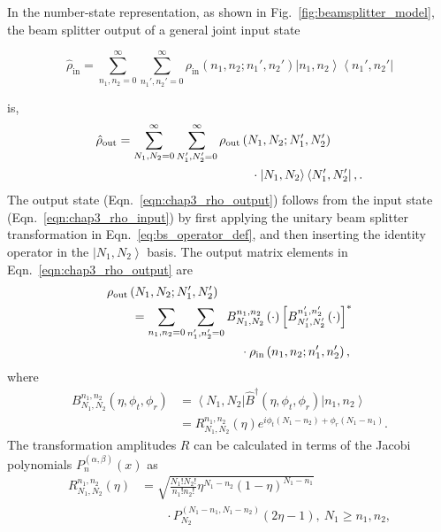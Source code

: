 \documentclass[aps,twocolumn,secnumarabic,amsmath,amssymb,pra,groupedaddress,
showpacs, showkeys]{revtex4-1}
\newcommand{\bra}[1]{\left\langle #1 \right|}
\newcommand{\ket}[1]{\left|#1\right\rangle}
\newcommand{\pna}[1]{\left(#1\right)}
\newcommand{\pnb}[1]{\left[#1\right]}
\newcommand{\eqn}[1]{
\begin{equation}
	#1
\end{equation}
}
\newcommand{\abs}[1]{\left|#1\right|}
\begin{document}
In the number-state representation, as shown in
Fig.~\ref{fig:beamsplitter_model}, the beam splitter output of a general joint
input state
\eqn{
\hat{\rho}_{\textrm{in}}=\sum_{n_1,n_2=0}^{\infty}\sum_{n_1',n_2'=0}^{\infty}
\rho_{\textrm{in}}\pna{n_1,n_2;n_1',n_2'}\ket{n_1,n_2}\bra{n_1',n_2'} \label{eqn:chap3_rho_input}
}
is,
\begin{align}
\hat{\rho}_{\textrm{out}} & =\sum_{N_1,N_2=0}^{\infty}\sum_{N_1',N_2'=0}^{\infty}
\rho_{\textrm{out}}\pna{N_1,N_2;N_1',N_2'} \nonumber \\ & \hspace{1.5in} \cdot\ket{N_1,N_2}\bra{N_1',N_2'},\label{eqn:chap3_rho_output}.
\end{align}
The output state (Eqn.~\ref{eqn:chap3_rho_output}) follows from the input state
(Eqn.~\ref{eqn:chap3_rho_input}) by first applying the unitary beam splitter
transformation in Eqn.~\ref{eq:bs_operator_def}, and then inserting the
identity operator in the $\ket{N_1,N_2}$ basis. The output matrix elements in
Eqn.~\ref{eqn:chap3_rho_output} are
\begin{align}
& \rho_{\textrm{out}}\pna{N_1,N_2;N_1',N_2'} \nonumber \\ & \qquad
=\sum_{n_1,n_2=0}\sum_{n_1',n_2'=0}
B_{N_1,N_2}^{n_1,n_2}\pna{\cdot}\pnb{B_{N_1',N_2'}^{n_1',n_2'}\pna{\cdot}}^{*}
\nonumber \\ & \hspace{1.5in}\cdot\rho_{\textrm{in}}\pna{n_1,n_2;n_1',n_2'},\label{eq:rho_output}
\end{align}
where
\begin{align}
B_{N_1,N_2}^{n_1,n_2}\pna{\eta,\phi_t,\phi_r} &= \bra{N_1,N_2}\hat{B}^{\dagger}\pna{\eta,\phi_t,\phi_r}\ket{n_1,n_2}\nonumber \\
& =R_{N_1,N_2}^{n_1,n_2}\pna{\eta} e^{i{\phi_t\pna{N_1-n_2}+\phi_r\pna{N_1-n_1}}}.
\end{align}
The transformation amplitudes $R$ can be calculated in terms of the Jacobi
polynomials $P_n^{\pna{\alpha,\beta}}\pna{x}$ as
\begin{align}
	R_{N_1,N_2}^{n_1,n_2}\pna{\eta}& =\sqrt{\frac{N_1!N_2!}{n_1!n_2!}
          \eta^{N_1-n_2}\pna{1-\eta}^{N_1-n_1}} \nonumber \\ & \qquad \cdot P_{N_2}^{\pna{N_1-n_1,N_1-n_2}}\pna{2\eta-1},~N_1\geq n_1,n_2,  \label{eqn:coefficient_value}
\end{align}
\end{document}
